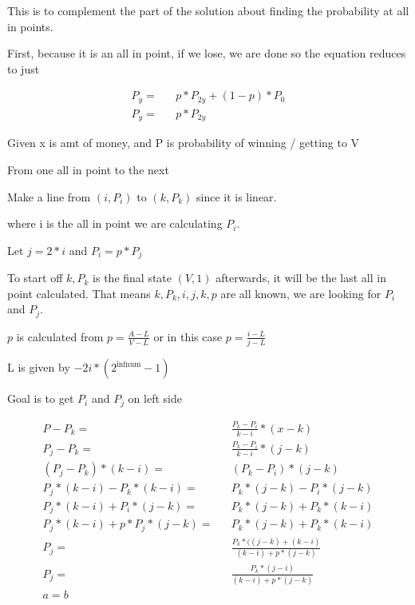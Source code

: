 \documentclass[fleqn]{article}
\begin{document}
This is to complement the part of the solution about finding the probability at all in points.

First, because it is an all in point, if we lose, we are done so the equation reduces to just

\begin{equation}
\begin{alignedat}{2}
  P_y  = && p * P_{2y} + (1-p) * P_{0}  \\
   P_y  = && p * P_{2y} 
 \end{alignedat}
\end{equation}


Given x is amt of money, and P is probability of winning / getting to V

From one all in point to the next

Make a line from $ (i, P_i) $  to $ (k, P_k) $ since it is linear.

where i is the all in point we are calculating $P_i$.

Let $ j = 2 * i $ and $ P_i = p * P_j $

To start off $k, P_k$ is the final state $(V, 1)$ afterwards, it will be the last all in point calculated.
That means $k, P_k, i, j, k, p$ are all known, we are looking for $P_i$ and $P_j$.

$p$ is calculated from $p = \frac{A-L}{V-L}$ or in this case $p = \frac{i-L}{j-L}$

L is given by $-2i * (2^\text{infnum} - 1)$

Goal is to get $P_i$ and $P_j$ on left side


\begin{equation}
\begin{alignedat}{2}
  P - P_k  = && \frac{P_k-P_i}{k-i} * (x - k)   \\
  P_j - P_k  = && \frac{P_k-P_i}{k-i} * (j - k)   \\
  (P_j - P_k) * (k-i) =  && (P_k-P_i) * (j - k) \\
  P_j * (k-i) - P_k * (k-i)  = && P_k * (j-k) - P_i * (j -k ) \\
  P_j * (k-i)  + P_i * (j -k ) = && P_k * (j-k)  + P_k * (k-i)\\
  P_j * (k-i)  + p*P_j * (j -k ) = && P_k * (j-k)  + P_k * (k-i)\\
  P_j  = && \frac{P_k * ( (j-k)  + (k-i)} {(k-i)+p*(j-k)}\\
  P_j  = && \frac{P_k * ( j-i)} {(k-i)+p*(j-k)}\\
  a = b
 \end{alignedat}
\end{equation}
\end{document}
